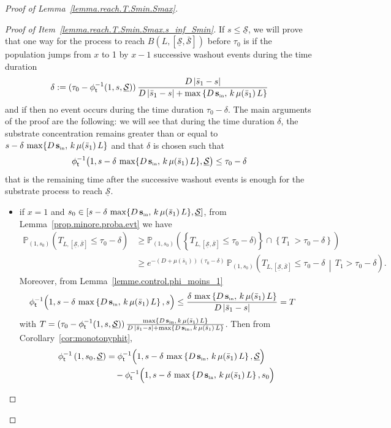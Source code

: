 \documentclass[10pt]{amsart}
\theoremstyle{definition}\newtheorem{defi}[theo]{Definition}\newtheorem{rema}[theo]{Remark}\newtheorem{exam}[theo]{Example}\newtheorem{exem}[theo]{Example}\newtheorem{nota}[theo]{Notation}
\newcommand{\PP}{\mathbb{P}}
\newcommand{\Sin}{{\mathbf s}_{\textrm{\tiny\rm in}}}
\newcommand{\Smin}{\underline{\mathcal{S}}}
\newcommand{\Smax}{\bar{\mathcal{S}}}
\newcommand{\barmu}{\mu(\bar s_1)}
\newcommand{\phit}{\phi_\textsf{t}^{-1}}
\newcommand{\1}{\mathbf{1}}
\begin{document}
\begin{proof}[Proof of Lemma~\ref{lemma.reach.T.Smin.Smax}]\leavevmode
\begin{proof}[{Proof of Item~\eqref{lemma.reach.T.Smin.Smax.s_inf_Smin}}]
If $s \leq \Smin$, we will prove that one way for the process to reach $B(L,[\Smin,\Smax])$ before $\tau_0$ is if the population jumps from $x$ to 1 by $x-1$ successive washout events during the time duration
\[
\delta:=(\tau_0-\phit(1, s,\Smin))\,\frac{D\,|\bar s_1-s|}{D\,|\bar s_1-s|+\max\left\{D\,\Sin,\,k\,\barmu\,L\right\}}
\]
and if then no event occurs during the time duration $\tau_0-\delta$. The main arguments of the proof are the following: we will see that during the time duration $\delta$, the substrate concentration remains greater than or equal to $s-\delta\,\max\{D\,\Sin,\,k\,\barmu\,L\}$ and that $\delta$ is chosen such that
\[
\phit\big(1, s-\delta\,\max\{D\,\Sin,\,k\,\barmu\,L\},\Smin\big)\leq \tau_0-\delta
\]
that is the remaining time after the successive washout events is enough for the substrate process to reach $\Smin$.
\begin{itemize}
\item if $x=1$ and $s_0 \in [s-\delta\,\max\{D\,\Sin,\,k\,\barmu\,L\}, \Smin]$, from Lemma~\ref{prop.minore.proba.evt} we have
\begin{align*}
\PP_{(1,s_0)}\left(T_{L,[\Smin,\Smax]}\leq \tau_0-\delta\right) & \geq
\PP_{(1,s_0)}\left(\left\{T_{L,[\Smin,\Smax]}\leq \tau_0-\delta)\right\}
\cap \left\{T_1\ > \tau_0-\delta\right\}\right)
\\
&\geq e^{-(D+\barmu)\, (\tau_0-\delta)}\,
\PP_{(1,s_0)}
\left(T_{L,\left[\Smin,\Smax\right]}\leq \tau_0-\delta \, \middle| \, T_1> \tau_0-\delta\right).
\end{align*}
Moreover, from Lemma~\ref{lemme.control.phi_moins_1}
\begin{align*}
\phit \Big(1,s-\delta\,\max\left\{D\,\Sin,\,k\,\barmu\,L\right\},s\Big) &\leq \frac{\delta\,\max\left\{D\,\Sin,\,k\,\barmu\,L\right\}}{D\,|\bar s_1-s|} =T
\end{align*}
with $T=(\tau_0-\phit(1, s,\Smin))\,\frac{\max\{D\,\Sin,\,k\,\barmu\,L\}}{D\,|\bar s_1-s|+\max\{D\,\Sin,\,k\,\barmu\,L\}}$. Then from Corollary~\ref{cor:monotonyphit},
\begin{align*}
\phit\left(1, s_0,\Smin \right) &= \phit \Big(1,s-\delta\,\max\left\{D\,\Sin,\,k\,\barmu\,L\right\},\Smin\Big)
\\ &\quad- \phit \Big(1,s-\delta\,\max\left\{D\,\Sin,\,k\,\barmu\,L\right\},s_0\Big)
\\

\end{align*}
\end{itemize}
\end{proof}
\end{proof}
\end{document}

